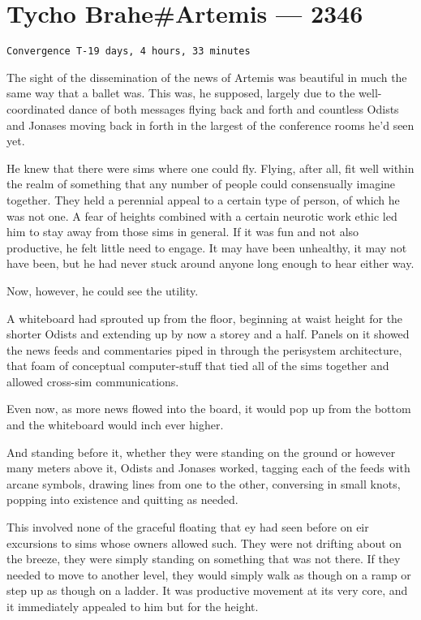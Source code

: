 \hypertarget{tycho-braheartemis-2346}{%
\chapter{Tycho Brahe\#Artemis — 2346}\label{tycho-braheartemis-2346}}

\begin{verbatim}
Convergence T-19 days, 4 hours, 33 minutes
\end{verbatim}

The sight of the dissemination of the news of Artemis was beautiful in much the same way that a ballet was. This was, he supposed, largely due to the well-coordinated dance of both messages flying back and forth and countless Odists and Jonases moving back in forth in the largest of the conference rooms he'd seen yet.

He knew that there were sims where one could fly. Flying, after all, fit well within the realm of something that any number of people could consensually imagine together. They held a perennial appeal to a certain type of person, of which he was not one. A fear of heights combined with a certain neurotic work ethic led him to stay away from those sims in general. If it was fun and not also productive, he felt little need to engage. It may have been unhealthy, it may not have been, but he had never stuck around anyone long enough to hear either way.

Now, however, he could see the utility.

A whiteboard had sprouted up from the floor, beginning at waist height for the shorter Odists and extending up by now a storey and a half. Panels on it showed the news feeds and commentaries piped in through the perisystem architecture, that foam of conceptual computer-stuff that tied all of the sims together and allowed cross-sim communications.

Even now, as more news flowed into the board, it would pop up from the bottom and the whiteboard would inch ever higher.

And standing before it, whether they were standing on the ground or however many meters above it, Odists and Jonases worked, tagging each of the feeds with arcane symbols, drawing lines from one to the other, conversing in small knots, popping into existence and quitting as needed.

This involved none of the graceful floating that ey had seen before on eir excursions to sims whose owners allowed such. They were not drifting about on the breeze, they were simply standing on something that was not there. If they needed to move to another level, they would simply walk as though on a ramp or step up as though on a ladder. It was productive movement at its very core, and it immediately appealed to him but for the height.

